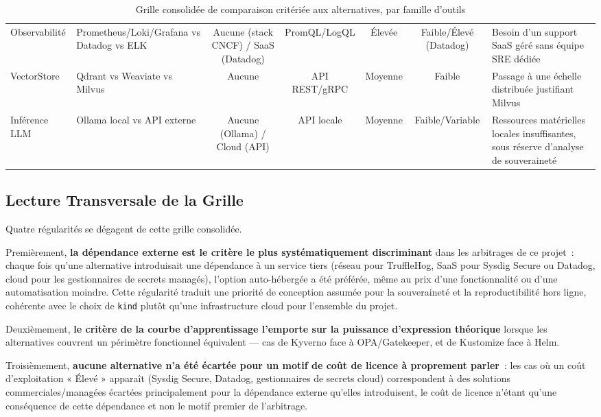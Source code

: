 \begin{table}[htbp]
\begin{tabular}{@{}p{2.2cm}p{2.8cm}ccccp{3.8cm}@{}}
Observabilité & Prometheus/Loki/Grafana vs Datadog vs ELK & Aucune (stack CNCF) / SaaS (Datadog) & PromQL/LogQL & Élevée & Faible/Élevé (Datadog) & Besoin d'un support SaaS géré sans équipe SRE dédiée \\
VectorStore & Qdrant vs Weaviate vs Milvus & Aucune & API REST/gRPC & Moyenne & Faible & Passage à une échelle distribuée justifiant Milvus \\
Inférence LLM & Ollama local vs API externe & Aucune (Ollama) / Cloud (API) & API locale & Moyenne & Faible/Variable & Ressources matérielles locales insuffisantes, sous réserve d'analyse de souveraineté \\
\bottomrule
\end{tabular}
\caption{Grille consolidée de comparaison critériée aux alternatives, par famille d'outils}
\label{tab:grille_multicritere}
\end{table}

\subsection{Lecture Transversale de la Grille}

Quatre régularités se dégagent de cette grille consolidée.

Premièrement, \textbf{la dépendance externe est le critère le plus systématiquement discriminant} dans les arbitrages de ce projet~: chaque fois qu'une alternative introduisait une dépendance à un service tiers (réseau pour TruffleHog, SaaS pour Sysdig Secure ou Datadog, cloud pour les gestionnaires de secrets managés), l'option auto-hébergée a été préférée, même au prix d'une fonctionnalité ou d'une automatisation moindre. Cette régularité traduit une priorité de conception assumée pour la souveraineté et la reproductibilité hors ligne, cohérente avec le choix de \texttt{kind} plutôt qu'une infrastructure cloud pour l'ensemble du projet.

Deuxièmement, \textbf{le critère de la courbe d'apprentissage l'emporte sur la puissance d'expression théorique} lorsque les alternatives couvrent un périmètre fonctionnel équivalent — cas de Kyverno face à OPA/Gatekeeper, et de Kustomize face à Helm.

Troisièmement, \textbf{aucune alternative n'a été écartée pour un motif de coût de licence à proprement parler}~: les cas où un coût d'exploitation « Élevé » apparaît (Sysdig Secure, Datadog, gestionnaires de secrets cloud) correspondent à des solutions commerciales/managées écartées principalement pour la dépendance externe qu'elles introduisent, le coût de licence n'étant qu'une conséquence de cette dépendance et non le motif premier de l'arbitrage.

